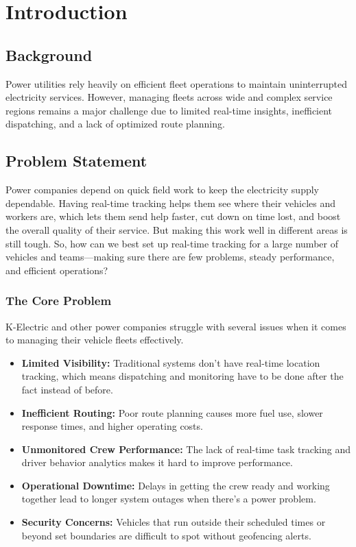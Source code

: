 

\maketitle
\chapter{Introduction}

\section{Background}
Power utilities rely heavily on efficient fleet operations to maintain uninterrupted electricity services. However, managing fleets across wide and complex service regions remains a major challenge due to limited real-time insights, inefficient dispatching, and a lack of optimized route planning.

\section{Problem Statement}
Power companies depend on quick field work to keep the electricity supply dependable. Having real-time tracking helps them see where their vehicles and workers are, which lets them send help faster, cut down on time lost, and boost the overall quality of their service. But making this work well in different areas is still tough. So, how can we best set up real-time tracking for a large number of vehicles and teams—making sure there are few problems, steady performance, and efficient operations?

\subsection{The Core Problem}
K-Electric and other power companies struggle with several issues when it comes to managing their vehicle fleets effectively.
\begin{itemize}
    \item \textbf{Limited Visibility:} Traditional systems don't have real-time location tracking, which means dispatching and monitoring have to be done after the fact instead of before.
    \item \textbf{Inefficient Routing:} Poor route planning causes more fuel use, slower response times, and higher operating costs.
    \item \textbf{Unmonitored Crew Performance:} The lack of real-time task tracking and driver behavior analytics makes it hard to improve performance.
    \item \textbf{Operational Downtime:} Delays in getting the crew ready and working together lead to longer system outages when there's a power problem.
    \item \textbf{Security Concerns:} Vehicles that run outside their scheduled times or beyond set boundaries are difficult to spot without geofencing alerts.
\end{itemize}


